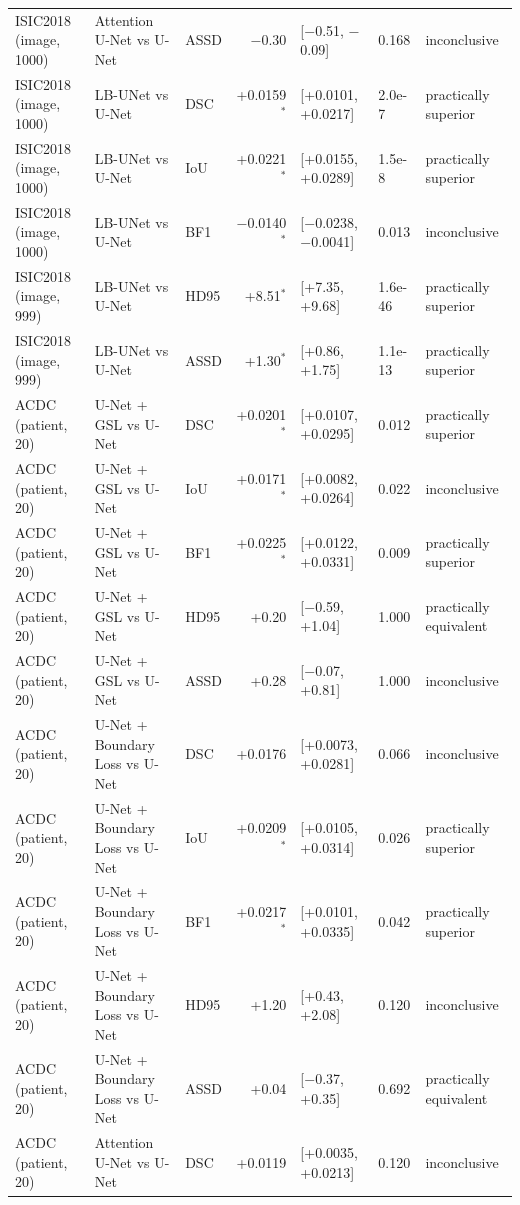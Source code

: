 \begin{tabular}{lllrlll}
ISIC2018 (image, 1000) & Attention U-Net vs U-Net & ASSD & $-$0.30 & [$-$0.51, $-$0.09] & 0.168 & inconclusive \\
ISIC2018 (image, 1000) & LB-UNet vs U-Net & DSC & +0.0159$^{*}$ & [+0.0101, +0.0217] & 2.0e-7 & practically superior \\
ISIC2018 (image, 1000) & LB-UNet vs U-Net & IoU & +0.0221$^{*}$ & [+0.0155, +0.0289] & 1.5e-8 & practically superior \\
ISIC2018 (image, 1000) & LB-UNet vs U-Net & BF1 & $-$0.0140$^{*}$ & [$-$0.0238, $-$0.0041] & 0.013 & inconclusive \\
ISIC2018 (image, 999) & LB-UNet vs U-Net & HD95 & +8.51$^{*}$ & [+7.35, +9.68] & 1.6e-46 & practically superior \\
ISIC2018 (image, 999) & LB-UNet vs U-Net & ASSD & +1.30$^{*}$ & [+0.86, +1.75] & 1.1e-13 & practically superior \\
\midrule
ACDC (patient, 20) & U-Net + GSL vs U-Net & DSC & +0.0201$^{*}$ & [+0.0107, +0.0295] & 0.012 & practically superior \\
ACDC (patient, 20) & U-Net + GSL vs U-Net & IoU & +0.0171$^{*}$ & [+0.0082, +0.0264] & 0.022 & inconclusive \\
ACDC (patient, 20) & U-Net + GSL vs U-Net & BF1 & +0.0225$^{*}$ & [+0.0122, +0.0331] & 0.009 & practically superior \\
ACDC (patient, 20) & U-Net + GSL vs U-Net & HD95 & +0.20 & [$-$0.59, +1.04] & 1.000 & practically equivalent \\
ACDC (patient, 20) & U-Net + GSL vs U-Net & ASSD & +0.28 & [$-$0.07, +0.81] & 1.000 & inconclusive \\
ACDC (patient, 20) & U-Net + Boundary Loss vs U-Net & DSC & +0.0176 & [+0.0073, +0.0281] & 0.066 & inconclusive \\
ACDC (patient, 20) & U-Net + Boundary Loss vs U-Net & IoU & +0.0209$^{*}$ & [+0.0105, +0.0314] & 0.026 & practically superior \\
ACDC (patient, 20) & U-Net + Boundary Loss vs U-Net & BF1 & +0.0217$^{*}$ & [+0.0101, +0.0335] & 0.042 & practically superior \\
ACDC (patient, 20) & U-Net + Boundary Loss vs U-Net & HD95 & +1.20 & [+0.43, +2.08] & 0.120 & inconclusive \\
ACDC (patient, 20) & U-Net + Boundary Loss vs U-Net & ASSD & +0.04 & [$-$0.37, +0.35] & 0.692 & practically equivalent \\
ACDC (patient, 20) & Attention U-Net vs U-Net & DSC & +0.0119 & [+0.0035, +0.0213] & 0.120 & inconclusive \\

\end{tabular}
